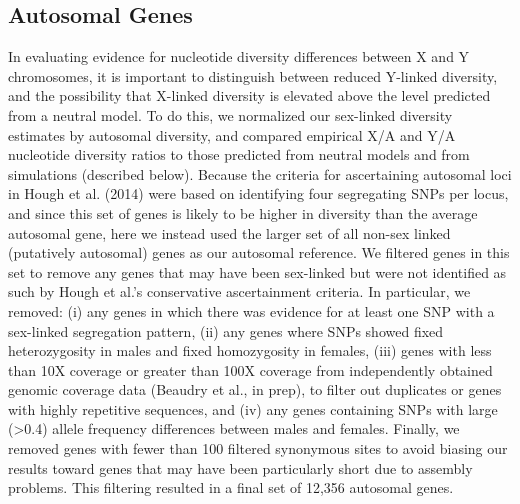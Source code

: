 \documentclass[9pt,twocolumn,twoside]{gsajnl}
\begin{document}
\subsection*{Autosomal Genes}
In evaluating evidence for nucleotide diversity differences between X and Y chromosomes, it is important to distinguish between reduced Y-linked diversity, and the possibility that X-linked diversity is elevated above the level predicted from a neutral model. To do this, we normalized our sex-linked diversity estimates by autosomal diversity, and compared empirical X/A and Y/A nucleotide diversity ratios to those predicted from neutral models and from simulations (described below). Because the criteria for ascertaining autosomal loci in Hough et al. (2014) were based on identifying four segregating SNPs per locus, and since this set of genes is likely to be higher in diversity than the average autosomal gene, here we instead used the larger set of all non-sex linked (putatively autosomal) genes as our autosomal reference. We filtered genes in this set to remove any genes that may have been sex-linked but were not identified as such by Hough et al.'s conservative ascertainment criteria. In particular, we removed: (i) any genes in which there was evidence for at least one SNP with a sex-linked segregation pattern, (ii) any genes where SNPs showed fixed heterozygosity in males and fixed homozygosity in females, (iii) genes with less than 10X coverage or greater than 100X coverage from independently obtained genomic coverage data (Beaudry et al., in prep), to filter out duplicates or genes with highly repetitive sequences, and (iv) any genes containing SNPs with large (>0.4) allele frequency differences between males and females. Finally, we removed genes with fewer than 100 filtered synonymous sites to avoid biasing our results toward genes that may have been particularly short due to assembly problems. This filtering resulted in a final set of 12,356 autosomal genes.
\end{document}

